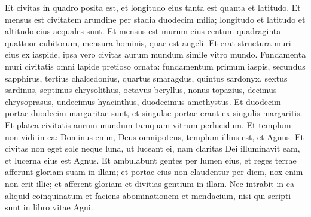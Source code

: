 \begin{biblechapter}
\begin{biblechapter}
\begin{biblechapter}
\begin{biblechapter}
\begin{biblechapter}
\begin{biblechapter}
\begin{biblechapter}
\begin{biblechapter}
\begin{biblechapter}
\begin{biblechapter}
\begin{biblechapter}
\begin{biblechapter}
\begin{biblechapter}
\begin{biblechapter}
\begin{biblechapter}
\begin{biblechapter}
\begin{biblechapter}
\begin{biblechapter}
\begin{biblechapter}
\begin{biblechapter}
\begin{biblechapter}
\verse Et civitas in quadro posita est, et longitudo eius tanta est quanta et latitudo. Et mensus est civitatem arundine per stadia duodecim milia; longitudo et latitudo et altitudo eius aequales sunt. 
\verse Et mensus est murum eius centum quadraginta quattuor cubitorum, mensura hominis, quae est angeli. 
\verse Et erat structura muri eius ex iaspide, ipsa vero civitas aurum mundum simile vitro mundo. 
\verse Fundamenta muri civitatis omni lapide pretioso ornata: fundamentum primum iaspis, secundus sapphirus, tertius chalcedonius, quartus smaragdus, 
\verse quintus sardonyx, sextus sardinus, septimus chrysolithus, octavus beryllus, nonus topazius, decimus chrysoprasus, undecimus hyacinthus, duodecimus amethystus. 
\verse Et duodecim portae duodecim margaritae sunt, et singulae portae erant ex singulis margaritis. Et platea civitatis aurum mundum tamquam vitrum perlucidum.
 \verse Et templum non vidi in ea: Dominus enim, Deus omnipotens, templum illius est, et Agnus. 
\verse Et civitas non eget sole neque luna, ut luceant ei, nam claritas Dei illuminavit eam, et lucerna eius est Agnus. 
\verse Et ambulabunt gentes per lumen eius, et reges terrae afferunt gloriam suam in illam; 
\verse et portae eius non claudentur per diem, nox enim non erit illic; 
\verse et afferent gloriam et divitias gentium in illam. 
\verse Nec intrabit in ea aliquid coinquinatum et faciens abominationem et mendacium, nisi qui scripti sunt in libro vitae Agni.
 

\end{biblechapter}
\end{biblechapter}
\end{biblechapter}
\end{biblechapter}
\end{biblechapter}
\end{biblechapter}
\end{biblechapter}
\end{biblechapter}
\end{biblechapter}
\end{biblechapter}
\end{biblechapter}
\end{biblechapter}
\end{biblechapter}
\end{biblechapter}
\end{biblechapter}
\end{biblechapter}
\end{biblechapter}
\end{biblechapter}
\end{biblechapter}
\end{biblechapter}
\end{biblechapter}
